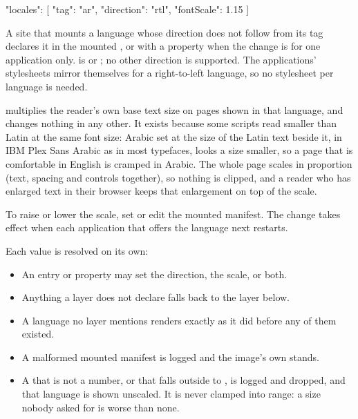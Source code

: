 \documentclass[11pt, a4paper]{article}
\begin{document}
\begin{elicitfile}
{ "locales": [ { "tag": "ar", "direction": "rtl", "fontScale": 1.15 } ] }
\end{elicitfile}

A site that mounts a language whose direction does not follow from its tag declares it in the
mounted , or with a property when the change is for one application
only.  is  or ; no other direction is supported. The
applications' stylesheets mirror themselves for a right-to-left language, so no stylesheet per
language is needed.

 multiplies the reader's own base text size on pages shown in that language, and
changes nothing in any other. It exists because some scripts read smaller than Latin at the same
font size: Arabic set at the size of the Latin text beside it, in IBM Plex Sans Arabic as in
most typefaces, looks a size smaller, so a page that is comfortable in English is cramped in
Arabic. The whole page scales in proportion (text, spacing and controls together), so
nothing is clipped, and a reader who has enlarged text in their browser keeps that enlargement
on top of the scale.

To raise or lower the scale, set  or edit the mounted manifest. The
change takes effect when each application that offers the language next restarts.

\begin{elicitnote}
Each value is resolved on its own:
\begin{itemize}
  \item An entry or property may set the direction, the scale, or both.
  \item Anything a layer does not declare falls back to the layer below.
  \item A language no layer mentions renders exactly as it did before any of them existed.
  \item A malformed mounted manifest is logged and the image's own stands.
  \item A  that is not a number, or that falls outside  to ,
        is logged and dropped, and that language is shown unscaled. It is never clamped into
        range: a size nobody asked for is worse than none.
\end{itemize}
\end{elicitnote}
\end{document}
